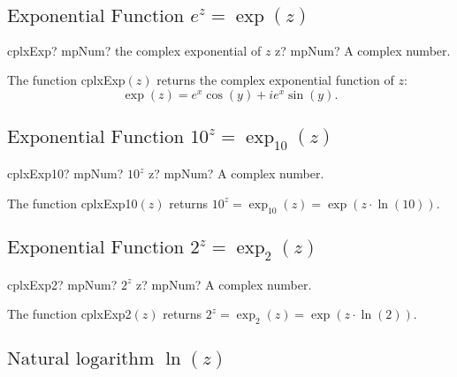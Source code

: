 \subsection{\texorpdfstring{$\text{Exponential Function }e^z = \exp(z)$}{exp}}

\begin{mpFunctionsExtract}
	\mpFunctionOne
	{cplxExp? mpNum? the complex exponential of $z$}
	{z? mpNum? A complex number.}
\end{mpFunctionsExtract}

\vspace{0.3cm}
The function \textsf{cplxExp$(z)$} returns the complex exponential function of $z$: 
\begin{equation}
	\exp(z) = e^x \cos(y) + i e^x \sin(y).
\end{equation}




\subsection{\texorpdfstring{$\text{Exponential Function }10^z = \exp_{10}(z)$}{exp10}}

\begin{mpFunctionsExtract}
	\mpFunctionOne
	{cplxExp10? mpNum?  $10^z$}
	{z? mpNum? A complex number.}
\end{mpFunctionsExtract}

\vspace{0.3cm}
The function \textsf{cplxExp10$(z)$} returns $10^z = \exp_{10}(z) = \exp(z \cdot \ln(10))$.




\subsection{\texorpdfstring{$\text{Exponential Function }2^z = \exp_2(z)$}{exp2}}

\begin{mpFunctionsExtract}
	\mpFunctionOne
	{cplxExp2? mpNum?  $2^z$}
	{z? mpNum? A complex number.}
\end{mpFunctionsExtract}

\vspace{0.3cm}
The function \textsf{cplxExp2$(z)$} returns $2^z = \exp_{2}(z) =  \exp(z \cdot \ln(2))$.






\newpage
\subsection{\texorpdfstring{$\text{Natural logarithm  }\ln(z) $}{ln}}

